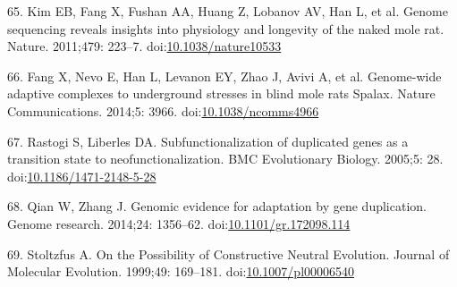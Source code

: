 \documentclass[]{elsarticle} %
\begin{document}
\leavevmode\hypertarget{ref-NakedMoleRatGenome}{}%
65. Kim EB, Fang X, Fushan AA, Huang Z, Lobanov AV, Han L, et al. Genome sequencing reveals insights into physiology and longevity of the naked mole rat. Nature. 2011;479: 223--7. doi:\href{https://doi.org/10.1038/nature10533}{10.1038/nature10533}

\leavevmode\hypertarget{ref-BlindMoleRatGenome}{}%
66. Fang X, Nevo E, Han L, Levanon EY, Zhao J, Avivi A, et al. Genome-wide adaptive complexes to underground stresses in blind mole rats Spalax. Nature Communications. 2014;5: 3966. doi:\href{https://doi.org/10.1038/ncomms4966}{10.1038/ncomms4966}

\leavevmode\hypertarget{ref-Rastogi2005}{}%
67. Rastogi S, Liberles DA. Subfunctionalization of duplicated genes as a transition state to neofunctionalization. BMC Evolutionary Biology. 2005;5: 28. doi:\href{https://doi.org/10.1186/1471-2148-5-28}{10.1186/1471-2148-5-28}

\leavevmode\hypertarget{ref-QianAndZhang2014}{}%
68. Qian W, Zhang J. Genomic evidence for adaptation by gene duplication. Genome research. 2014;24: 1356--62. doi:\href{https://doi.org/10.1101/gr.172098.114}{10.1101/gr.172098.114}

\leavevmode\hypertarget{ref-Stoltzfus1999}{}%
69. Stoltzfus A. On the Possibility of Constructive Neutral Evolution. Journal of Molecular Evolution. 1999;49: 169--181. doi:\href{https://doi.org/10.1007/pl00006540}{10.1007/pl00006540}
\end{document}
